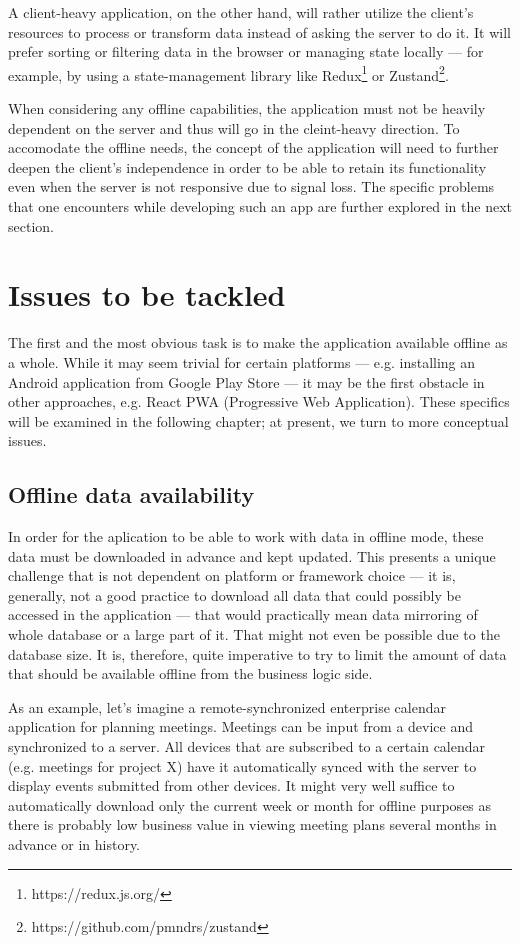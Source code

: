 \documentclass[
  digital,     %
  color,       %
  oneside,     %
  nosansbold,  %
  nocolorbold, %
  lof,         %
  lot,         %
]{fithesis4}
\begin{document}
A client-heavy application, on the other hand, will rather utilize the client's resources to process or transform data instead of asking the server to do it. It will prefer sorting or filtering data in the browser or managing state locally --- for example, by using a state-management library like Redux\footnote{https://redux.js.org/} or Zustand\footnote{https://github.com/pmndrs/zustand}.

When considering any offline capabilities, the application must not be heavily dependent on the server and thus will go in the cleint-heavy direction. To accomodate the offline needs, the concept of the application will need to further deepen the client's independence in order to be able to retain its functionality even when the server is not responsive due to signal loss. The specific problems that one encounters while developing such an app are further explored in the next section.
\section{Issues to be tackled}
The first and the most obvious task is to make the application available offline as a whole. While it may seem trivial for certain platforms --- e.g. installing an Android application from Google Play Store --- it may be the first obstacle in other approaches, e.g. React PWA (Progressive Web Application). These specifics will be examined in the following chapter; at present, we turn to more conceptual issues.
\subsection{Offline data availability}
In order for the aplication to be able to work with data in offline mode, these data must be downloaded in advance and kept updated. This presents a unique challenge that is not dependent on platform or framework choice --- it is, generally, not a good practice to download all data that could possibly be accessed in the application --- that would practically mean data mirroring of whole database or a large part of it. That might not even be possible due to the database size. It is, therefore, quite imperative to try to limit the amount of data that should be available offline from the business logic side.

As an example, let's imagine a remote-synchronized enterprise calendar application for planning meetings. Meetings can be input from a device and synchronized to a server. All devices that are subscribed to a certain calendar (e.g. meetings for project X) have it automatically synced with the server to display events submitted from other devices. It might very well suffice to automatically download only the current week or month for offline purposes as there is probably low business value in viewing meeting plans several months in advance or in history. 
\end{document}
